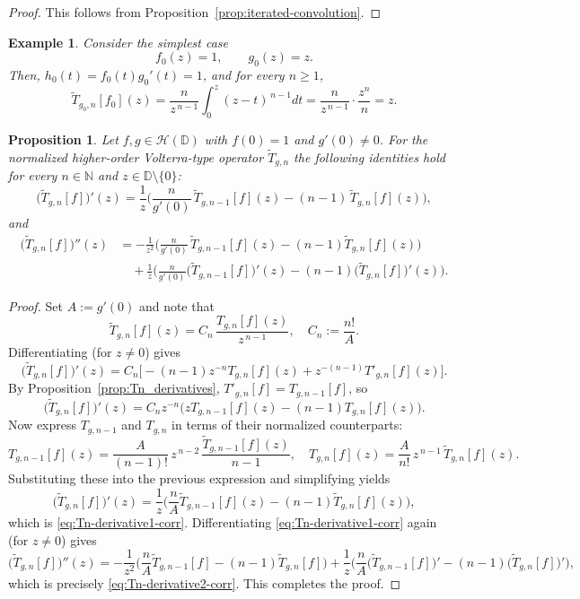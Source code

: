 \documentclass[12pt,a4paper]{amsart}
\numberwithin{equation}{section}
\newtheorem{example}{Example}[section]
\newtheorem{proposition}{Proposition}[section]
\theoremstyle{remark}
\begin{document}
\begin{proof}
This follows from Proposition~\ref{prop:iterated-convolution}.
\end{proof}

\begin{example}\label{ex-f0 g0-identity}\rm
Consider the simplest case
\[
f_0(z)=1,\qquad g_0(z)=z.
\]
Then, \(h_0(t)=f_0(t)g_0'(t)=1\), and for every \(n\ge1\),
\[
\widetilde{T}_{g_0,n}[f_0](z)
=\frac{n}{z^{\,n-1}}\int_0^z (z-t)^{\,n-1}dt
=\frac{n}{z^{\,n-1}}\cdot\frac{z^n}{n}
=z.
\]
\end{example}

\begin{proposition}\label{prop:normalized-Tn-derivatives}
Let \(f,g\in\mathcal{H}(\mathbb{D})\) with \(f(0)=1\) and \(g'(0)\neq0\).
For the normalized higher-order Volterra-type operator
$\widetilde{T}_{g,n}$
the following identities hold for every \(n\in\mathbb{N}\) and \(z\in\mathbb{D}\setminus\{0\}\):
\begin{equation}\label{eq:Tn-derivative1-corr}
\big(\widetilde{T}_{g,n}[f]\big)'(z)
=\frac{1}{z}\Big(\frac{n}{g'(0)}\,\widetilde{T}_{g,n-1}[f](z)
-(n-1)\,\widetilde{T}_{g,n}[f](z)\Big),
\end{equation}
and
\begin{align}\label{eq:Tn-derivative2-corr}
\big(\widetilde{T}_{g,n}[f]\big)''(z)
&=-\frac{1}{z^2}\Big(\frac{n}{g'(0)}\,\widetilde{T}_{g,n-1}[f](z)-(n-1)\widetilde{T}_{g,n}[f](z)\Big)\nonumber\\
&\quad +\frac{1}{z}\Big(\frac{n}{g'(0)}\big(\widetilde{T}_{g,n-1}[f]\big)'(z)
-(n-1)\big(\widetilde{T}_{g,n}[f]\big)'(z)\Big).
\end{align}
\end{proposition}

\begin{proof}
Set \(A:=g'(0)\) and note that
\[
\widetilde{T}_{g,n}[f](z)
= C_n\,\frac{T_{g,n}[f](z)}{z^{\,n-1}},
\quad 
C_n:=\frac{n!}{A}.
\]
Differentiating (for \(z\neq0\)) gives
\[
\big(\widetilde{T}_{g,n}[f]\big)'(z)
= C_n\Big[-(n-1)z^{-n}T_{g,n}[f](z) + z^{-(n-1)}T'_{g,n}[f](z)\Big].
\]
By Proposition~\ref{prop:Tn_derivatives}, \(T'_{g,n}[f]=T_{g,n-1}[f]\), so
\[
\big(\widetilde{T}_{g,n}[f]\big)'(z)
= C_n z^{-n}\big(zT_{g,n-1}[f](z)-(n-1)T_{g,n}[f](z)\big).
\]
Now express \(T_{g,n-1}\) and \(T_{g,n}\) in terms of their normalized counterparts:
\[
T_{g,n-1}[f](z)
=\frac{A}{(n-1)!}\,z^{\,n-2}\,\frac{\widetilde{T}_{g,n-1}[f](z)}{n-1},
\quad
T_{g,n}[f](z)
=\frac{A}{n!}\,z^{\,n-1}\,\widetilde{T}_{g,n}[f](z).
\]
Substituting these into the previous expression and simplifying yields
\[
\big(\widetilde{T}_{g,n}[f]\big)'(z)
=\frac{1}{z}\Big(\frac{n}{A}\widetilde{T}_{g,n-1}[f](z)
-(n-1)\widetilde{T}_{g,n}[f](z)\Big),
\]
which is \eqref{eq:Tn-derivative1-corr}.
Differentiating \eqref{eq:Tn-derivative1-corr} again (for \(z\neq0\)) gives
\[
\big(\widetilde{T}_{g,n}[f]\big)''(z)
=-\frac{1}{z^2}\Big(\frac{n}{A}\widetilde{T}_{g,n-1}[f]-(n-1)\widetilde{T}_{g,n}[f]\Big)
+\frac{1}{z}\Big(\frac{n}{A}\big(\widetilde{T}_{g,n-1}[f]\big)'
-(n-1)\big(\widetilde{T}_{g,n}[f]\big)'\Big),
\]
which is precisely \eqref{eq:Tn-derivative2-corr}. 
This completes the proof.
\end{proof}
\end{document}
